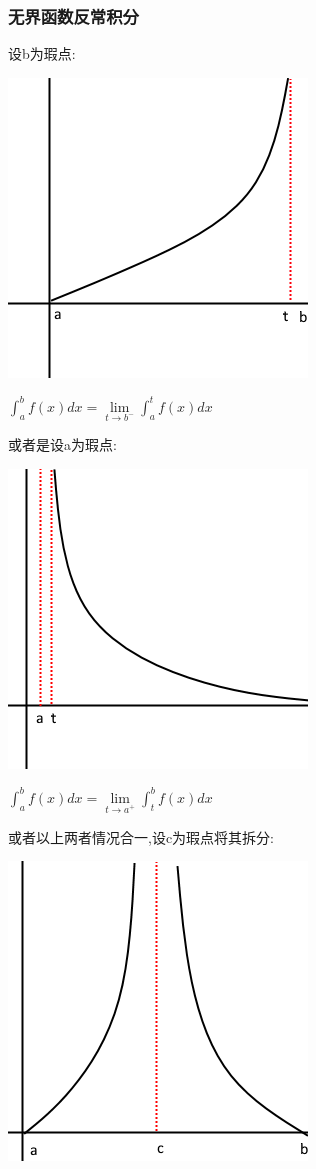 \documentclass[UTF8,12pt]{ctexbook}
\newcommand{\limNormal}[1]{\lim\limits_{#1}}
\newcommand{\defFunction}[1]{f(#1)}
\newcommand{\definiteIntegral}[2]{\int^{#1}_{#2}}
\begin{document}
{{{\subsubsection{无界函数反常积分}{

  设b为瑕点:

  \includegraphics[scale=0.5]{resources/infityFunctionUnormalIntegral.png}

  $\definiteIntegral{b}{a}\defFunction{x}dx = \limNormal{t \to b^-}\definiteIntegral{t}{a}\defFunction{x}dx$

  或者是设a为瑕点:

  \includegraphics[scale=0.5]{resources/infityFunctionUnormalIntegral2.png}

  $\definiteIntegral{b}{a}\defFunction{x}dx = \limNormal{t \to a^+}\definiteIntegral{b}{t}\defFunction{x}dx$

  或者以上两者情况合一,设c为瑕点将其拆分:

  \includegraphics{resources/infityFunctionUnormalIntegral3.png}

}}}}
\end{document}
